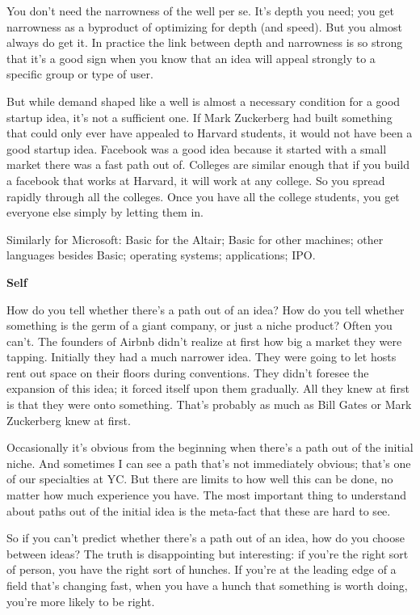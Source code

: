 \documentclass[12pt]{book}
\begin{document}
You don't need the narrowness of the well per se. It's depth you need;
you get narrowness as a byproduct of optimizing for depth (and speed).
But you almost always do get it. In practice the link between depth and
narrowness is so strong that it's a good sign when you know that an idea
will appeal strongly to a specific group or type of user.

But while demand shaped like a well is almost a necessary condition for
a good startup idea, it's not a sufficient one. If Mark Zuckerberg had
built something that could only ever have appealed to Harvard students,
it would not have been a good startup idea. Facebook was a good idea
because it started with a small market there was a fast path out of.
Colleges are similar enough that if you build a facebook that works at
Harvard, it will work at any college. So you spread rapidly through all
the colleges. Once you have all the college students, you get everyone
else simply by letting them in.

Similarly for Microsoft: Basic for the Altair; Basic for other machines;
other languages besides Basic; operating systems; applications; IPO.

\textbf{Self}

How do you tell whether there's a path out of an idea? How do you tell
whether something is the germ of a giant company, or just a niche
product? Often you can't. The founders of Airbnb didn't realize at first
how big a market they were tapping. Initially they had a much narrower
idea. They were going to let hosts rent out space on their floors during
conventions. They didn't foresee the expansion of this idea; it forced
itself upon them gradually. All they knew at first is that they were
onto something. That's probably as much as Bill Gates or Mark Zuckerberg
knew at first.

Occasionally it's obvious from the beginning when there's a path out of
the initial niche. And sometimes I can see a path that's not immediately
obvious; that's one of our specialties at YC. But there are limits to
how well this can be done, no matter how much experience you have. The
most important thing to understand about paths out of the initial idea
is the meta-fact that these are hard to see.

So if you can't predict whether there's a path out of an idea, how do
you choose between ideas? The truth is disappointing but interesting: if
you're the right sort of person, you have the right sort of hunches. If
you're at the leading edge of a field that's changing fast, when you
have a hunch that something is worth doing, you're more likely to be
right.
\end{document}
